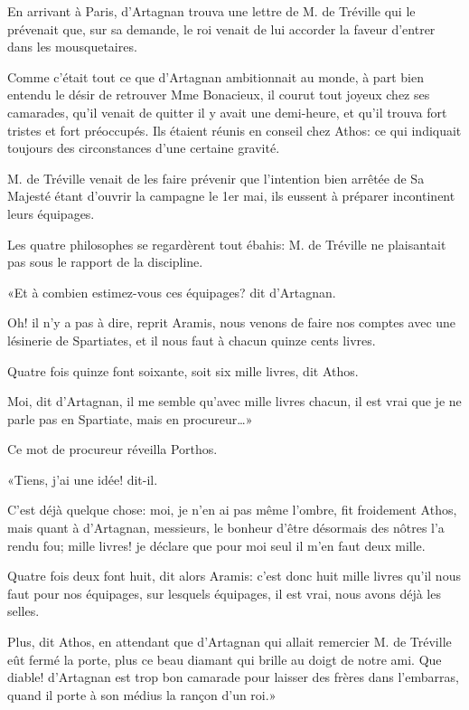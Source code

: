 En arrivant à Paris, d'Artagnan trouva une lettre de M. de Tréville qui le prévenait que, sur sa demande, le roi venait de lui accorder la faveur d'entrer dans les mousquetaires. 

Comme c'était tout ce que d'Artagnan ambitionnait au monde, à part bien entendu le désir de retrouver Mme Bonacieux, il courut tout joyeux chez ses camarades, qu'il venait de quitter il y avait une demi-heure, et qu'il trouva fort tristes et fort préoccupés. Ils étaient réunis en conseil chez Athos: ce qui indiquait toujours des circonstances d'une certaine gravité. 

M. de Tréville venait de les faire prévenir que l'intention bien arrêtée de Sa Majesté étant d'ouvrir la campagne le 1er mai, ils eussent à préparer incontinent leurs équipages. 

Les quatre philosophes se regardèrent tout ébahis: M. de Tréville ne plaisantait pas sous le rapport de la discipline. 

«Et à combien estimez-vous ces équipages? dit d'Artagnan. 

\speak  Oh! il n'y a pas à dire, reprit Aramis, nous venons de faire nos comptes avec une lésinerie de Spartiates, et il nous faut à chacun quinze cents livres. 

\speak  Quatre fois quinze font soixante, soit six mille livres, dit Athos. 

\speak  Moi, dit d'Artagnan, il me semble qu'avec mille livres chacun, il est vrai que je ne parle pas en Spartiate, mais en procureur\dots» 

Ce mot de procureur réveilla Porthos. 

«Tiens, j'ai une idée! dit-il. 

\speak  C'est déjà quelque chose: moi, je n'en ai pas même l'ombre, fit froidement Athos, mais quant à d'Artagnan, messieurs, le bonheur d'être désormais des nôtres l'a rendu fou; mille livres! je déclare que pour moi seul il m'en faut deux mille. 

\speak  Quatre fois deux font huit, dit alors Aramis: c'est donc huit mille livres qu'il nous faut pour nos équipages, sur lesquels équipages, il est vrai, nous avons déjà les selles. 

\speak  Plus, dit Athos, en attendant que d'Artagnan qui allait remercier M. de Tréville eût fermé la porte, plus ce beau diamant qui brille au doigt de notre ami. Que diable! d'Artagnan est trop bon camarade pour laisser des frères dans l'embarras, quand il porte à son médius la rançon d'un roi.»